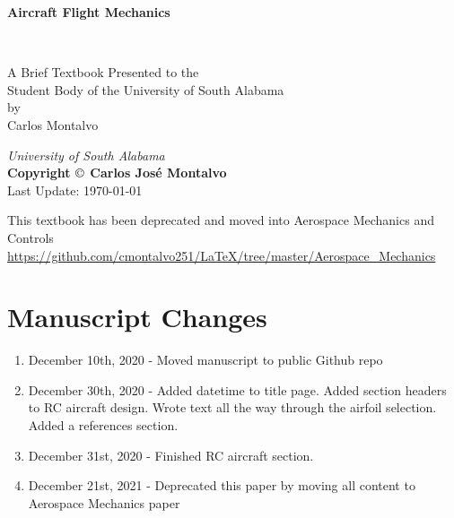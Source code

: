 \documentclass{article}
\begin{document}
\begin{center}
\begin{LARGE}{\bf Aircraft Flight Mechanics}\end{LARGE}\\
\large
\vspace{22 mm}
\begin{singlespace}
   A Brief Textbook Presented to the \\ 
   Student Body of the University of South Alabama \\
\vspace{22 mm}
   by\\
\vspace{22 mm}
  Carlos Montalvo \\
\vspace{22 mm}
\end{singlespace}
{\itshape University of South Alabama}\\
{\bf Copyright $\copyright$ Carlos Jos\'{e} Montalvo}
\\ Last Update: \today
\end{center}

\newpage

\noindent This textbook has been deprecated and moved into Aerospace
Mechanics and Controls
\url{https://github.com/cmontalvo251/LaTeX/tree/master/Aerospace_Mechanics}

\section*{Manuscript Changes}

\begin{enumerate}[itemsep=-5pt]
\item December 10th, 2020 - Moved manuscript to public Github repo
\item December 30th, 2020 - Added datetime to title page. Added
  section headers to RC aircraft design. Wrote text all the way
  through the airfoil selection. Added a references section.
\item December 31st, 2020 - Finished RC aircraft section.
\item December 21st, 2021 - Deprecated this paper by moving all
  content to Aerospace Mechanics paper
\end{enumerate}
\end{document}
